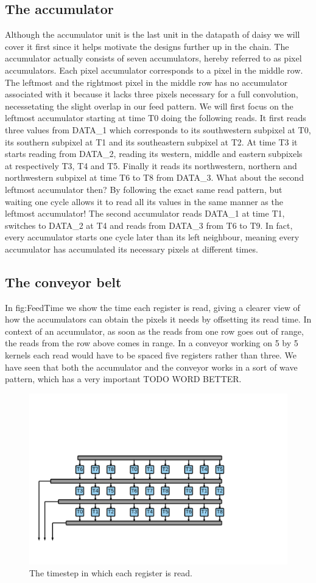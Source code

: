 \subsection{The accumulator}
Although the accumulator unit is the last unit in the datapath of daisy we will cover it first since it helps motivate the designs further up in the chain.
The accumulator actually consists of seven accumulators, hereby referred to as pixel accumulators. Each pixel accumulator corresponds to a pixel in the middle row.
The leftmost and the rightmost pixel in the middle row has no accumulator associated with it because it lacks three pixels necessary for a full convolution, necessetating the slight overlap in our feed pattern.
We will first focus on the leftmost accumulator starting at time T0 doing the following reads. 
It first reads three values from DATA\_1 which corresponds to its southwestern subpixel at T0, its southern subpixel at T1 and its southeastern subpixel at T2. 
At time T3 it starts reading from DATA\_2, reading its western, middle and eastern subpixels at respectively T3, T4 and T5. 
Finally it reads its northwestern, northern and northwestern subpixel at time T6 to T8 from DATA\_3.
What about the second leftmost accumulator then? By following the exact same read pattern, but waiting one cycle allows it to read all its values in the same manner as the leftmost accumulator!
The second accumulator reads DATA\_1 at time T1, switches to DATA\_2 at T4 and reads from DATA\_3 from T6 to T9. 
In fact, every accumulator starts one cycle later than its left neighbour, meaning every accumulator has accumulated its necessary pixels at different times.

\subsection{The conveyor belt}
In fig:FeedTime we show the time each register is read, giving a clearer view of how the accumulators can obtain the pixels it needs by offsetting its read time.
In context of an accumulator, as soon as the reads from one row goes out of range, the reads from the row above comes in range. In a conveyor working on 5 by 5 kernels each read would have to be spaced five registers rather than three.
We have seen that both the accumulator and the conveyor works in a sort of wave pattern, which has a very important TODO WORD BETTER.



\begin{figure}[h!]
    \includegraphics[width=\linewidth]{img/FeederTimeAnnotated.png}
    \caption{The timestep in which each register is read.}
    \label{fig:FeedTime}
\end{figure}

